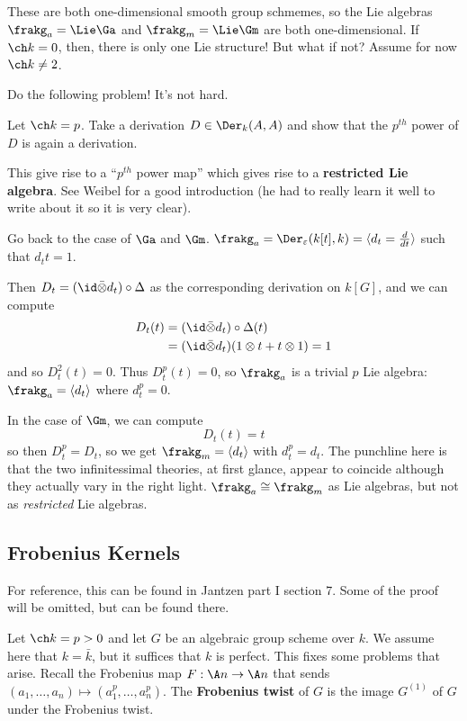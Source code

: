 \documentclass[12pt]{article}
\begin{document}
These are both one-dimensional smooth group schmemes, so the Lie algebras $\frakg_a=\Lie \Ga$ and $\frakg_m=\Lie\Gm$
are both one-dimensional. If $\ch k=0$, then, there is only one Lie structure! But what if not?
Assume for now $\ch k\ne 2$.

Do the following problem! It's not hard.
\begin{prob}
	Let $\ch k=p$. Take a derivation $D\in \Der_k(A,A)$ and show that the $p^{th}$ power of $D$ is again a derivation.
\end{prob}

This give rise to a ``$p^{th}$ power map'' which gives rise to a \textbf{restricted Lie algebra}. See Weibel for a good 
introduction (he had to really learn it well to write about it so it is very clear).

Go back to the case of $\Ga$ and $\Gm$. $\frakg_a=\Der_\varepsilon(k[t],k)=\langle d_t=\frac{d}{dt}\rangle$
such that $d_tt=1$.

Then $D_t=(\id\bar\otimes d_t)\circ\Delta$ as the corresponding derivation on $k[G]$, and we can compute 
\begin{align*}
	D_t(t)&= (\id\bar\otimes d_t)\circ \Delta(t)\\
	&= (\id\bar\otimes d_t)(1\otimes t+t\otimes 1)=1
\end{align*}
and so $D_t^2(t)=0$. Thus $D_t^p(t)=0$, so $\frakg_a$ is a trivial $p$ Lie algebra: $\frakg_a=\langle d_t\rangle$
where $d_t^p=0$. 

In the case of $\Gm$, we can compute 
\[D_t(t)=t\]
so then $D_t^p=D_t$, so we get $\frakg_m=\langle d_t\rangle$ with $d_t^p=d_t$. The punchline here is 
that the two infinitessimal theories, at first glance, appear to coincide although they actually vary 
in the right light. $\frakg_a\cong\frakg_m$ as Lie algebras, but not as \textit{restricted} Lie algebras.

\subsection{Frobenius Kernels}
For reference, this can be found in Jantzen part I section 7. Some of the proof will be omitted, but can be found there.

\brk

Let $\ch k=p>0$ and let $G$ be an algebraic group scheme over $k$. We assume here that $k=\bar k$, but it suffices that 
$k$ is perfect. This fixes some problems that arise. Recall the Frobenius map $F:\A n\to \A n$
that sends $(a_1,\dots,a_n)\mapsto(a_1^p,\dots,a_n^p)$. The \textbf{Frobenius twist} of $G$ is the image 
$G^{(1)}$ of $G$ under the Frobenius twist.
\end{document}
